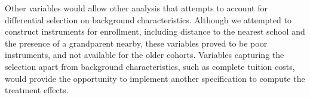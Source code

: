 
Other variables would allow other analysis that attempts to account for differential selection on background characteristics. Although we attempted to construct instruments for enrollment, including distance to the nearest school and the presence of a grandparent nearby, these variables proved to be poor instruments, and not available for the older cohorts. Variables capturing the selection apart from background characteristics, such as complete tuition costs, would provide the opportunity to implement another specification to compute the treatment effects.



